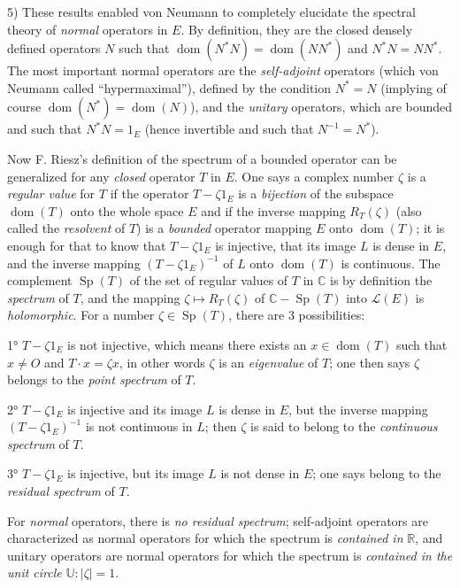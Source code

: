 \documentclass[12pt,a4paper,leqno,twoside]{extbook}
\newcommand{\C}{\mathbb{C}}
\newcommand{\R}{\mathbb{R}}
\newcommand{\dom}{\operatorname{dom}}
\newcommand{\spec}{\operatorname{Sp}}
\begin{document}
5) These results enabled von Neumann to completely elucidate the spectral theory of \emph{normal} operators in \(E\). By definition, they are the closed densely defined operators \(N\) such that
\(\dom(N^* N) = \dom(N N^*)\) and \(N^* N = N N^*\). The most important normal operators are the \emph{self-adjoint} operators (which von Neumann called ``hypermaximal''), defined by the condition \(N^* = N\) (implying of course \(\dom(N^*) = \dom(N)\)), and the \emph{unitary} operators, which are bounded and such that \(N^* N = 1_E\) (hence invertible and such that \(N^{-1} = N^*\)).

Now F. Riesz's definition of the spectrum of a bounded operator can be generalized for any \emph{closed} operator \(T\) in \(E\). One says a complex number \(\zeta\) is a \emph{regular value} for \(T\) if the operator \(T - \zeta 1_E\) is a \emph{bijection} of the subspace \(\dom(T)\) onto the whole space \(E\) and if the inverse mapping \(R_T(\zeta)\) (also called the \emph{resolvent} of \(T\)) is a \emph{bounded} operator mapping \(E\) onto \(\dom(T)\); it is enough for that to know that \(T - \zeta 1_E\) is injective, that its image \(L\) is dense in \(E\), and the inverse mapping \((T - \zeta 1_E)^{-1}\) of \(L\) onto \(\dom(T)\) is continuous. The complement \(\spec(T)\) of the set of regular values of \(T\) in \(\C\) is by definition the \emph{spectrum} of \(T\), and the mapping \(\zeta \mapsto R_T(\zeta)\) of \(\C - \spec(T)\) into \(\mathcal{L}(E)\) is \emph{holomorphic}. For a number \(\zeta \in \spec(T)\), there are 3 possibilities:

1° \(T - \zeta 1_E\) is not injective, which means there exists an \(x \in \dom(T)\) such that \(x \neq O\) and \(T \cdot x = \zeta x\), in other words \(\zeta\) is an \emph{eigenvalue} of \(T\); one then says \(\zeta\) belongs to the \emph{point spectrum} of \(T\).

2° \(T - \zeta 1_E\) is injective and its image \(L\) is dense in \(E\), but the inverse mapping \((T - \zeta 1_E)^{-1}\) is not continuous in \(L\); then \(\zeta\) is said to belong to the \emph{continuous spectrum} of \(T\).

3° \(T - \zeta 1_E\) is injective, but its image \(L\) is not dense in \(E\); one says belong to the \emph{residual spectrum} of \(T\).

For \emph{normal} operators, there is \emph{no residual spectrum}; self-adjoint operators are characterized as normal operators for which the spectrum is \emph{contained in} \(\R\), and unitary operators are normal operators for which the spectrum is \emph{contained in the unit circle} \(\mathbb{U}: |\zeta| = 1\).
\end{document}
